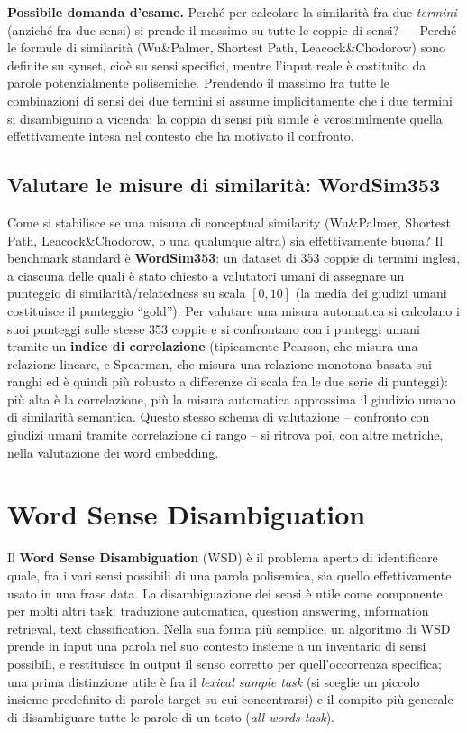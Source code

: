 \documentclass[11pt,a4paper]{report}
\newcommand{\domandaesame}[1]{\begin{esame}\textbf{Possibile domanda d'esame.} #1\end{esame}}
\begin{document}
\domandaesame{Perché per calcolare la similarità fra due \emph{termini} (anziché fra due sensi) si prende il massimo su tutte le coppie di sensi? --- Perché le formule di similarità (Wu\&Palmer, Shortest Path, Leacock\&Chodorow) sono definite su synset, cioè su sensi specifici, mentre l'input reale è costituito da parole potenzialmente polisemiche. Prendendo il massimo fra tutte le combinazioni di sensi dei due termini si assume implicitamente che i due termini si disambiguino a vicenda: la coppia di sensi più simile è verosimilmente quella effettivamente intesa nel contesto che ha motivato il confronto.}

\subsection{Valutare le misure di similarità: WordSim353}

Come si stabilisce se una misura di conceptual similarity (Wu\&Palmer, Shortest Path, Leacock\&Chodorow, o una qualunque altra) sia effettivamente buona? Il benchmark standard è \textbf{WordSim353}: un dataset di 353 coppie di termini inglesi, a ciascuna delle quali è stato chiesto a valutatori umani di assegnare un punteggio di similarità/relatedness su scala $[0,10]$ (la media dei giudizi umani costituisce il punteggio ``gold''). Per valutare una misura automatica si calcolano i suoi punteggi sulle stesse 353 coppie e si confrontano con i punteggi umani tramite un \textbf{indice di correlazione} (tipicamente Pearson, che misura una relazione lineare, e Spearman, che misura una relazione monotona basata sui ranghi ed è quindi più robusto a differenze di scala fra le due serie di punteggi): più alta è la correlazione, più la misura automatica approssima il giudizio umano di similarità semantica. Questo stesso schema di valutazione -- confronto con giudizi umani tramite correlazione di rango -- si ritrova poi, con altre metriche, nella valutazione dei word embedding.

\section{Word Sense Disambiguation}

Il \textbf{Word Sense Disambiguation} (WSD) è il problema aperto di identificare quale, fra i vari sensi possibili di una parola polisemica, sia quello effettivamente usato in una frase data. La disambiguazione dei sensi è utile come componente per molti altri task: traduzione automatica, question answering, information retrieval, text classification. Nella sua forma più semplice, un algoritmo di WSD prende in input una parola nel suo contesto insieme a un inventario di sensi possibili, e restituisce in output il senso corretto per quell'occorrenza specifica; una prima distinzione utile è fra il \emph{lexical sample task} (si sceglie un piccolo insieme predefinito di parole target su cui concentrarsi) e il compito più generale di disambiguare tutte le parole di un testo (\emph{all-words task}).
\end{document}
